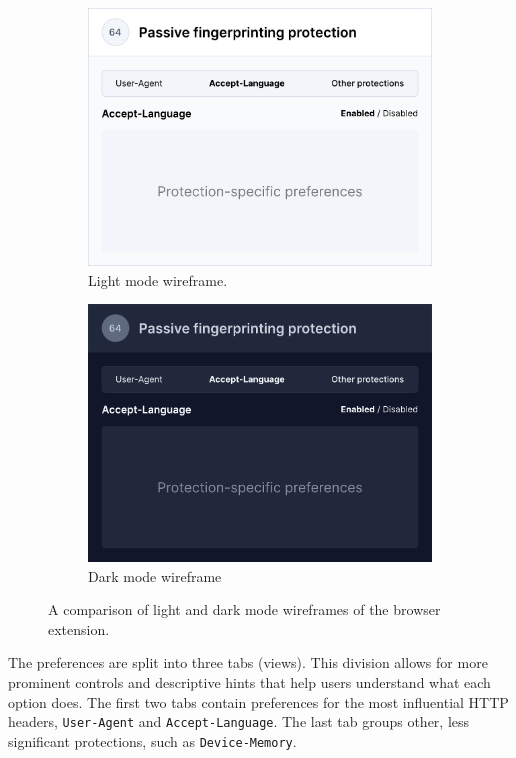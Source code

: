 \begin{figure}[H]
\centering
\begin{subfigure}{.5\textwidth}
  \centering
  \includegraphics[width=.95\linewidth]{obrazky-figures/wireframe}
  \caption{Light mode wireframe.}
\end{subfigure}%
\begin{subfigure}{.5\textwidth}
  \centering
  \includegraphics[width=.95\linewidth]{obrazky-figures/wireframe-dark}
  \caption{Dark mode wireframe}
\end{subfigure}
\caption{A comparison of light and dark mode wireframes of the browser extension.}
\label{Fig:Wireframes}
\end{figure}

\medbreak

The preferences are split into three tabs (views). This division allows for more prominent controls and descriptive hints that help users understand what each option does. The first two tabs contain preferences for the most influential HTTP headers, \texttt{User-Agent} and \texttt{Accept-Language}. The last tab groups other, less significant protections, such as \texttt{Device-Memory}.

